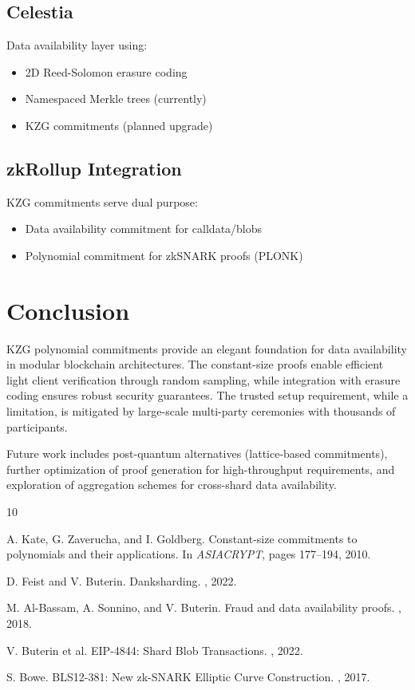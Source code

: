\documentclass[11pt,a4paper]{article}
\begin{document}
\subsection{Celestia}

Data availability layer using:
\begin{itemize}
    \item 2D Reed-Solomon erasure coding
    \item Namespaced Merkle trees (currently)
    \item KZG commitments (planned upgrade)
\end{itemize}

\subsection{zkRollup Integration}

KZG commitments serve dual purpose:
\begin{itemize}
    \item Data availability commitment for calldata/blobs
    \item Polynomial commitment for zkSNARK proofs (PLONK)
\end{itemize}

\section{Conclusion}

KZG polynomial commitments provide an elegant foundation for data availability in modular blockchain architectures. The constant-size proofs enable efficient light client verification through random sampling, while integration with erasure coding ensures robust security guarantees. The trusted setup requirement, while a limitation, is mitigated by large-scale multi-party ceremonies with thousands of participants.

Future work includes post-quantum alternatives (lattice-based commitments), further optimization of proof generation for high-throughput requirements, and exploration of aggregation schemes for cross-shard data availability.


\begin{thebibliography}{10}

A. Kate, G. Zaverucha, and I. Goldberg.
\newblock Constant-size commitments to polynomials and their applications.
\newblock In {\em ASIACRYPT}, pages 177--194, 2010.

D. Feist and V. Buterin.
\newblock Danksharding.
, 2022.

M. Al-Bassam, A. Sonnino, and V. Buterin.
\newblock Fraud and data availability proofs.
, 2018.

V. Buterin et al.
\newblock EIP-4844: Shard Blob Transactions.
, 2022.

S. Bowe.
\newblock BLS12-381: New zk-SNARK Elliptic Curve Construction.
, 2017.

\end{thebibliography}
\end{document}
